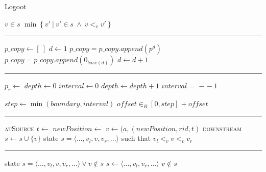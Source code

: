 \documentclass[diss.tex]{subfiles}
\begin{document}
\begin{algorithm}[H]
\caption*{Logoot}
\begin{algorithmic}[1]
\Require $v \in s$
\State \Return $\min \left\{ v' ~|~ v' \in s ~\wedge~ v <_v v'  \right\}$
\EndFunction
\end{algorithmic}

\hrule

\begin{algorithmic}[1]
\State $p\_copy \gets [~]$
\State $d \gets 1$
$p\_copy = p\_copy.append(p^d)$
\Else
$p\_copy = p\_copy.append(0_{base(d)})$ 
\EndIf
\State $d \gets d+1$
\EndWhile
\EndFunction
\end{algorithmic}

\hrule

\begin{algorithmic}[1]
\State $p_r \gets $ 
\State $depth \gets 0$
\State $interval \gets 0$
\State $depth \gets depth + 1$
\State $interval = $  $ - $  $-~1$ 
\EndWhile

\State $step \gets \min(boundary, interval)$ 
\State $o\!f\!f\!set \in_R [0, step]$
\State \Return {} $ +~ o\!f\!f\!set$
\EndFunction
\end{algorithmic}

\hrule

\begin{algorithmic}[1]
\BState \textsc{atSource}
\State $t \gets $  
\State $newPosition \gets $
\State $v \gets (a, (newPosition, rid, t)$
\BState \textsc{downstream}
\State $s \gets s \cup \{v\}$
\EndFunction
\Ensure state $s = \langle ..., v_l, v, v_r, ... \rangle$ such that $v_l <_v v <_v v_r$
\end{algorithmic}

\hrule

\begin{algorithmic}[1]

\Require state $s = \langle ..., v_l, v, v_r, ... \rangle \vee v \notin s$
\State $s \gets \langle ..., v_l, v_r, ... \rangle$
\EndIf
\EndFunction
\Ensure $v \notin s$
\end{algorithmic}
\end{algorithm}
\end{document}
